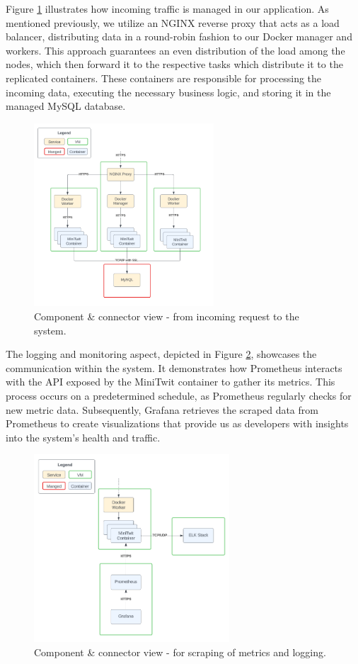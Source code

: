 Figure \ref{fig:2} illustrates how incoming traffic is managed in our application. As mentioned previously, we utilize an NGINX reverse proxy that acts as a load balancer, distributing data in a round-robin fashion to our Docker manager and workers. This approach guarantees an even distribution of the load among the nodes, which then forward it to the respective tasks which distribute it to the replicated containers. These containers are responsible for processing the incoming data, executing the necessary business logic, and storing it in the managed MySQL database.
\begin{figure}[H]
  \centering
  \includegraphics[width=0.60\textwidth]{images/system_perspective/OverView1.png}
  \caption{Component \& connector view - from incoming request to the system.}
  \label{fig:2}
\end{figure}
The logging and monitoring aspect, depicted in Figure \ref{fig:3}, showcases the communication within the system. It demonstrates how Prometheus interacts with the API exposed by the MiniTwit container to gather its metrics. This process occurs on a predetermined schedule, as Prometheus regularly checks for new metric data. Subsequently, Grafana retrieves the scraped data from Prometheus to create visualizations that provide us as developers with insights into the system's health and traffic.
\begin{figure}[H]
  \centering
  \includegraphics[width=0.65\textwidth]{images/system_perspective/OverViewZoom1.png}
  \caption{Component \& connector view - for scraping of metrics and logging.}
  \label{fig:3}
\end{figure}
